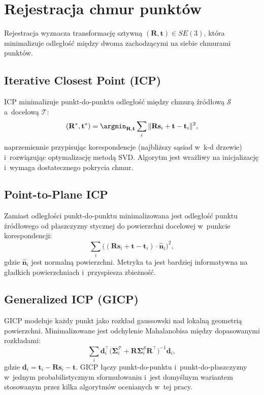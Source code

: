 \section{Rejestracja chmur punktów}

Rejestracja wyznacza transformację sztywną $(\mathbf{R}, \mathbf{t}) \in SE(3)$,
która minimalizuje odległość między dwoma zachodzącymi na siebie chmurami punktów.

\subsection{Iterative Closest Point (ICP)}

ICP minimalizuje punkt-do-punktu odległość między chmurą źródłową $\mathcal{S}$
a~docelową $\mathcal{T}$:
\begin{equation}
    (\mathbf{R}^*, \mathbf{t}^*) = \argmin_{\mathbf{R},\mathbf{t}}
    \sum_{i} \| \mathbf{R}\mathbf{s}_i + \mathbf{t} - \mathbf{t}_i \|^2,
\end{equation}
naprzemiennie przypisując korespondencje (najbliższy sąsiad w~k-d drzewie)
i~rozwiązując optymalizację metodą SVD.
Algorytm jest wrażliwy na inicjalizację i~wymaga dostatecznego pokrycia chmur.

\subsection{Point-to-Plane ICP}

Zamiast odległości punkt-do-punktu minimalizowana jest odległość punktu źródłowego
od płaszczyzny stycznej do powierzchni docelowej w~punkcie korespondencji:
\begin{equation}
    \sum_{i} \bigl((\mathbf{R}\mathbf{s}_i + \mathbf{t} - \mathbf{t}_i)
    \cdot \hat{\mathbf{n}}_i\bigr)^2,
\end{equation}
gdzie $\hat{\mathbf{n}}_i$ jest normalną powierzchni.
Metryka ta jest bardziej informatywna na gładkich powierzchniach i~przyspiesza
zbieżność.

\subsection{Generalized ICP (GICP)}

GICP modeluje każdy punkt jako rozkład gaussowski nad lokalną geometrią powierzchni.
Minimalizowane jest odchylenie Mahalanobisa między dopasowanymi rozkładami:
\begin{equation}
    \sum_{i} \mathbf{d}_i^\top
    \bigl(\mathbf{\Sigma}_i^{\mathcal{T}} + \mathbf{R}\mathbf{\Sigma}_i^{\mathcal{S}}\mathbf{R}^\top\bigr)^{-1}
    \mathbf{d}_i,
\end{equation}
gdzie $\mathbf{d}_i = \mathbf{t}_i - \mathbf{R}\mathbf{s}_i - \mathbf{t}$.
GICP łączy punkt-do-punktu i~punkt-do-płaszczyzny w~jednym probabilistycznym
sformułowaniu i~jest domyślnym wariantem stosowanym przez kilka algorytmów
ocenianych w~tej pracy.

